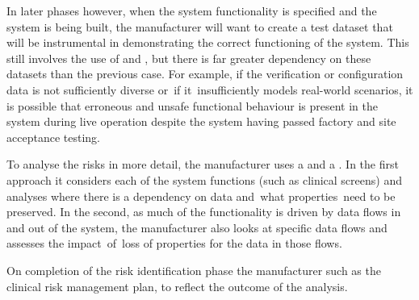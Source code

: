 In later phases however, when the system functionality is specified and the system is being built, the manufacturer will want to create a test \gls{dataset} that will be instrumental in demonstrating the correct functioning of the system. This still involves the use of  and , but there is far greater dependency on these \glspl{dataset} than the previous case. For example, if the \gls{verification} or \gls{configuration data} is not sufficiently diverse or\cbstart\ if it\cbend\ insufficiently models real-world scenarios, it is possible that erroneous and unsafe functional behaviour is present in the system during live operation despite the system having passed factory and site acceptance testing.

To analyse the risks in more detail, the manufacturer uses a  and a . In the first approach it considers each of the system functions (such as clinical screens) and analyses where there is a dependency on data and\cbstart\ what properties\cbend\ need to be preserved. In the second, as much of the functionality is driven by data flows in and out of the system, the manufacturer also looks at specific data flows and assesses the impact\cbstart\ of\cbend\ loss of properties for the data in those flows.

On completion of the risk identification phase the manufacturer  such as the clinical risk management plan, to reflect the outcome of the analysis.

